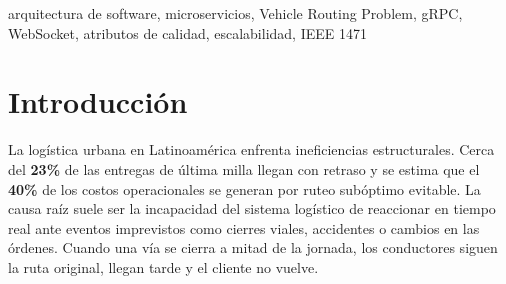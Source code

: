 \documentclass[conference]{IEEEtran}
\begin{document}
\begin{abstract}
Este art\'iculo presenta \emph{LogiFlow}, una plataforma distribuida \emph{cloud-native} dise\~nada para resolver el \emph{Vehicle Routing Problem} (VRP) din\'amico en menos de cuatro segundos ante eventos de tr\'afico, cierres viales o incidencias log\'isticas. La soluci\'on adopta un estilo arquitect\'onico basado en microservicios con un \emph{API Gateway} sobre NestJS, optimizaci\'on gRPC contra VROOM, ajuste de matrices de duraci\'on mediante un modelo de IA propio para corredores de Bogot\'a, comunicaci\'on en tiempo real con \emph{Socket.io} respaldada por \emph{Redis Pub/Sub}, automatizaci\'on de ingesta de eventos con \emph{n8n} y notificaciones multicanal con \emph{OpenClaw} y \emph{Firebase Cloud Messaging}. El sistema fue desplegado en producci\'on sobre Azure con infraestructura como c\'odigo (Terraform). Los resultados medidos sobre el entorno real reportan \textbf{20.98~TPS} sostenibles con P95 de \textbf{2.8 segundos} bajo 50 usuarios concurrentes, \textbf{99.79\%} de disponibilidad de infraestructura, \textbf{cobertura de tests} de 80.49\% en frontend y 83.36\% en backend, y portabilidad total mediante Docker y Terraform.
\end{abstract}

\begin{IEEEkeywords}
arquitectura de software, microservicios, Vehicle Routing Problem, gRPC, WebSocket, atributos de calidad, escalabilidad, IEEE 1471
\end{IEEEkeywords}

\section{Introducci\'on}

La log\'istica urbana en Latinoam\'erica enfrenta ineficiencias estructurales. Cerca del \textbf{23\%} de las entregas de \'ultima milla llegan con retraso y se estima que el \textbf{40\%} de los costos operacionales se generan por ruteo sub\'optimo evitable. La causa ra\'iz suele ser la incapacidad del sistema log\'istico de reaccionar en tiempo real ante eventos imprevistos como cierres viales, accidentes o cambios en las \'ordenes. Cuando una v\'ia se cierra a mitad de la jornada, los conductores siguen la ruta original, llegan tarde y el cliente no vuelve.
\end{document}
